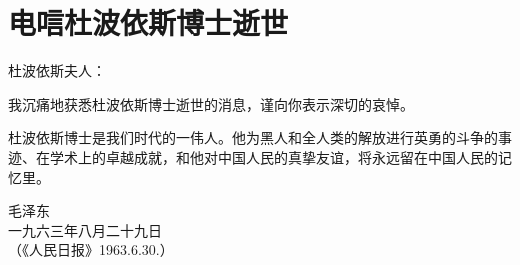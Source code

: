 \section[电唁杜波依斯博士逝世（一九六三年八月二十九日）]{电唁杜波依斯博士逝世}


杜波依斯夫人：

我沉痛地获悉杜波依斯博士逝世的消息，谨向你表示深切的哀悼。

杜波依斯博士是我们时代的一伟人。他为黑人和全人类的解放进行英勇的斗争的事迹、在学术上的卓越成就，和他对中国人民的真挚友谊，将永远留在中国人民的记忆里。

{\raggedleft 毛泽东\\一九六三年八月二十九日\\（《人民日报》1963.6.30.）\par}

